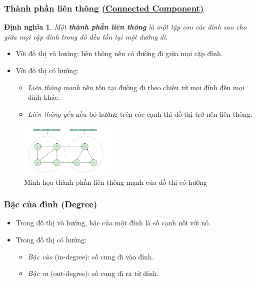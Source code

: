 \documentclass{article}
\newtheorem{dinhnghia}{Định nghĩa}
\begin{document}
\subsubsection{Thành phần liên thông \href{https://www.geeksforgeeks.org/dsa/strongly-connected-components/}{(Connected Component)}}
\begin{dinhnghia}

    Một \textbf{thành phần liên thông} là một tập con các đỉnh sao cho giữa mọi cặp đỉnh trong đó đều tồn tại một đường đi.
\end{dinhnghia}
    
\begin{itemize}
    \item Với đồ thị vô hướng: liên thông nếu có đường đi giữa mọi cặp đỉnh.
    \item Với đồ thị có hướng:
        \begin{itemize}
            \item \textit{Liên thông mạnh} nếu tồn tại đường đi theo chiều từ mọi đỉnh đến mọi đỉnh khác.
            \item \textit{Liên thông yếu} nếu bỏ hướng trên các cạnh thì đồ thị trở nên liên thông.
        \end{itemize}
\end{itemize}

\begin{figure}[H]
    \centering
    \includegraphics[width=0.4\textwidth]{img/b1/SCC.png}
    \caption{Minh họa thành phần liên thông mạnh của đồ thị có hướng}
    \label{SCC}
\end{figure}

\subsubsection{Bậc của đỉnh (Degree)}
\begin{itemize}
    \item Trong đồ thị vô hướng, bậc của một đỉnh là số cạnh nối với nó.
    \item Trong đồ thị có hướng:
        \begin{itemize}
            \item \textit{Bậc vào} (in-degree): số cung đi vào đỉnh.
            \item \textit{Bậc ra} (out-degree): số cung đi ra từ đỉnh.
        \end{itemize}
\end{itemize}
\end{document}
